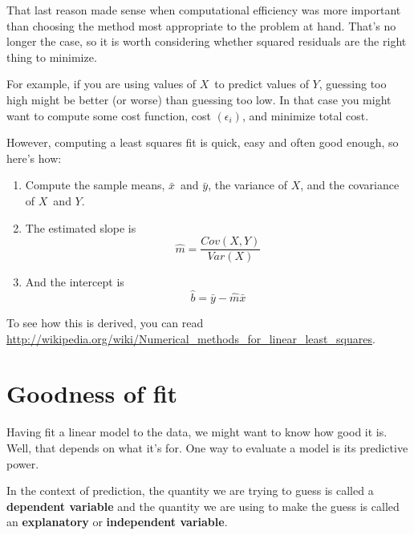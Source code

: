 That last reason made sense when computational efficiency was more
important than choosing the method most appropriate to the problem
at hand.  That's no longer the case, so it is worth considering
whether squared residuals are the right thing to minimize.

For example, if you are using values of $X$~to predict values of $Y$,
guessing too high might be better (or worse) than guessing too low.
In that case you might want to compute some cost function,
cost $(\epsilon_{i})$, and minimize total cost.

However, computing a least squares fit is quick, easy and often good
enough, so here's how:

\begin{enumerate}

\item Compute the sample means, $\bar{x}$~and $\bar{y}$, the variance
of $X$, and the covariance of $X$~and $Y$.

\item The estimated slope is
%
\[ \hat{m} = \frac{Cov(X,Y)}{Var(X)} \]
%
\item And the intercept is
%
\[ \hat{b} = \bar{y} - \hat{m} \bar{x} \]
%
\end{enumerate}

To see how this is derived, you can read
\url{http://wikipedia.org/wiki/Numerical_methods_for_linear_least_squares}.




\section{Goodness of fit}

Having fit a linear model to the data, we might want to know how good
it is.  Well, that depends on what it's for.  One way to evaluate a
model is its predictive power.

In the context of prediction, the quantity we are trying to guess is
called a {\bf dependent variable} and the quantity we are using to
make the guess is called an {\bf explanatory} or {\bf independent
  variable}.


